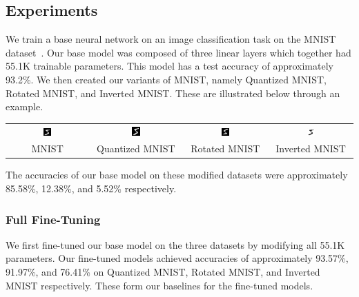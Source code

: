 \documentclass{article}
\begin{document}
\subsection{Experiments}
We train a base neural network on an image classification task on the MNIST dataset~\cite{lecun2010mnist}. Our base model was composed of three linear layers which together had 55.1K trainable parameters. This model has a test accuracy of approximately 93.2\%. We then created our variants of MNIST, namely Quantized MNIST, Rotated MNIST, and Inverted MNIST. These are illustrated below through an example.
\begin{center}
    \begin{tabular}{c c c c}
		\includegraphics[width=0.1\textwidth]{images/normal_5.png} & \includegraphics[width=0.1\textwidth]{images/quantized_5.png} & \includegraphics[width=0.1\textwidth]{images/rotated_5.png} & \includegraphics[width=0.1\textwidth]{images/inverted_5.png} \\
		MNIST & Quantized MNIST & Rotated MNIST & Inverted MNIST
    \end{tabular}
\end{center}
The accuracies of our base model on these modified datasets were approximately 85.58\%, 12.38\%, and 5.52\% respectively.


\subsubsection{Full Fine-Tuning}
We first fine-tuned our base model on the three datasets by modifying all 55.1K parameters. Our fine-tuned models achieved accuracies of approximately 93.57\%, 91.97\%, and 76.41\% on Quantized MNIST, Rotated MNIST, and Inverted MNIST respectively. These form our baselines for the fine-tuned models.
\end{document}
